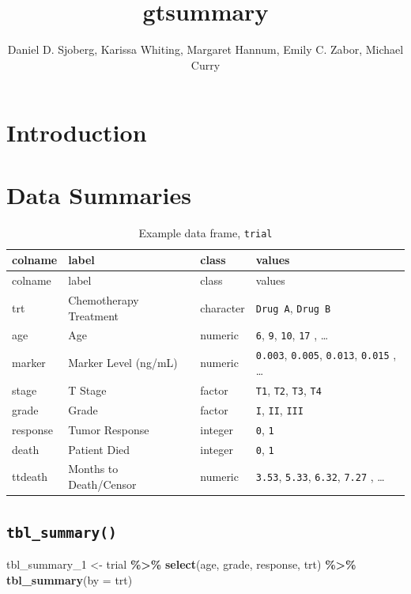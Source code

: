 \documentclass[
]{article}
\title{gtsummary}
\author{Daniel D. Sjoberg, Karissa Whiting, Margaret Hannum, Emily C.
Zabor, Michael Curry}
\date{}
\newenvironment{Shaded}{\begin{snugshade}}{\end{snugshade}}
\newcommand{\DataTypeTok}[1]{\textcolor[rgb]{0.13,0.29,0.53}{#1}}
\newcommand{\DecValTok}[1]{\textcolor[rgb]{0.00,0.00,0.81}{#1}}
\newcommand{\KeywordTok}[1]{\textcolor[rgb]{0.13,0.29,0.53}{\textbf{#1}}}
\newcommand{\NormalTok}[1]{#1}
\newcommand{\OperatorTok}[1]{\textcolor[rgb]{0.81,0.36,0.00}{\textbf{#1}}}
\newcommand{\StringTok}[1]{\textcolor[rgb]{0.31,0.60,0.02}{#1}}
\begin{document}
\maketitle

\hypertarget{introduction}{%
\section{Introduction}\label{introduction}}

\hypertarget{data-summaries}{%
\section{Data Summaries}\label{data-summaries}}

\begin{longtable}[]{@{}llll@{}}
\caption{Example data frame, \texttt{trial}}\tabularnewline
\toprule
colname & label & class & values\tabularnewline
\midrule
\endfirsthead
\toprule
colname & label & class & values\tabularnewline
\midrule
\endhead
trt & Chemotherapy Treatment & character & \texttt{Drug\ A},
\texttt{Drug\ B}\tabularnewline
age & Age & numeric & \texttt{6}, \texttt{9}, \texttt{10}, \texttt{17} ,
\ldots{}\tabularnewline
marker & Marker Level (ng/mL) & numeric & \texttt{0.003},
\texttt{0.005}, \texttt{0.013}, \texttt{0.015} , \ldots{}\tabularnewline
stage & T Stage & factor & \texttt{T1}, \texttt{T2}, \texttt{T3},
\texttt{T4}\tabularnewline
grade & Grade & factor & \texttt{I}, \texttt{II},
\texttt{III}\tabularnewline
response & Tumor Response & integer & \texttt{0},
\texttt{1}\tabularnewline
death & Patient Died & integer & \texttt{0}, \texttt{1}\tabularnewline
ttdeath & Months to Death/Censor & numeric & \texttt{3.53},
\texttt{5.33}, \texttt{6.32}, \texttt{7.27} , \ldots{}\tabularnewline
\bottomrule
\end{longtable}

\hypertarget{tbl_summary}{%
\subsection{\texorpdfstring{\texttt{tbl\_summary()}}{tbl\_summary()}}\label{tbl_summary}}

\begin{Shaded}
\begin{Highlighting}[]
\NormalTok{tbl\_summary\_}\DecValTok{1}\NormalTok{ <{-}}
\StringTok{  }\NormalTok{trial }\OperatorTok{\%>\%}
\StringTok{  }\KeywordTok{select}\NormalTok{(age, grade, response, trt) }\OperatorTok{\%>\%}
\StringTok{  }\KeywordTok{tbl\_summary}\NormalTok{(}\DataTypeTok{by =}\NormalTok{ trt)}
\end{Highlighting}
\end{Shaded}
\end{document}
